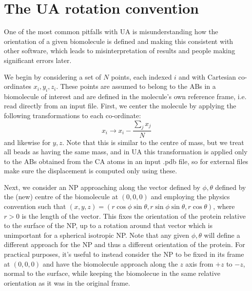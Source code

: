 \documentclass[10pt,a4paper,onecolumn]{report}
\begin{document}
\section{The UA rotation convention} \label{section:uarotations}
One of the most common pitfalls with UA is misunderstanding how the orientation of a given biomolecule is defined and making this consistent with other software, which leads to misinterpretation of results and people making significant errors later. 

We begin by considering a set of $N$ points, each indexed $i$ and with Cartesian co-ordinates $x_i,y_i,z_i$. These points are assumed to belong to the ABs in a biomolecule of interest and are defined in the molecule's own reference frame, i.e. read directly from an input file. First, we center the molecule by applying the following transformations to each co-ordinate:
\begin{equation}
x_i \rightarrow x_i - \frac{\sum_j x_j }{N}
\end{equation}
and likewise for $y,z$. Note that this is similar to the centre of mass, but we treat all beads as having the same mass, and in UA this transformation is applied only to the ABs obtained from the CA atoms in an input .pdb file, so for external files make sure the displacement is computed only using these.

Next, we consider an NP approaching along the vector defined by $\phi,\theta$ defined by the (new) centre of the biomolecule at $(0,0,0)$ and employing the physics convention such that $(x,y,z) = (r \cos \phi \sin \theta, r \sin \phi \sin \theta, r \cos \theta)$, where $r > 0$ is the length of the vector. This fixes the orientation of the protein relative to the surface of the NP, up to a rotation around that vector which is unimportant for a spherical isotropic NP. Note that any given $\phi,\theta$ will define a different approach for the NP and thus a different orientation of the protein.  For practical purposes, it's useful to instead consider the NP to be fixed in its frame at $(0,0,0)$ and have the biomolecule approach along the $z$ axis from $+z$ to $-z$, normal to the surface, while keeping the biomolecue in the same relative orientation as it was in the original frame. 
\end{document}
